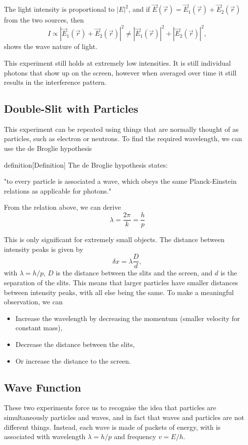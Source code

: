 \documentclass{article}
\begin{document}
The light intensity is proportional to $|E|^2$, and if $\vec{E}(\vec{r})=\vec{E}_1(\vec{r})+\vec{E}_2(\vec{r})$ from the two sources, then
\[
    I \propto \left| \vec{E}_1(\vec{r})+\vec{E}_2(\vec{r}) \right|^2\neq \left| \vec{E}_1(\vec{r}) \right|^2+ \left| \vec{E}_2(\vec{r}) \right|^2,
\]
shows the wave nature of light.

This experiment still holds at extremely low intensities. It is still individual photons that show up on the screen, however when averaged over time it still results in the interference pattern.

\subsection{Double-Slit with Particles}
This experiment can be repeated using things that are normally thought of as particles, such as electron or neutrons. To find the required wavelength, we can use the de Broglie hypothesis
\begin{callout}{definition}[Definition]
\label{definition:s1-d1}
The de Broglie hypothesis states:

\indent "to every particle is associated a wave, which obeys the same Planck-Einstein relations as applicable for photons."

From the relation above, we can derive
\[
    \boxed{\lambda =\frac{2\pi }{k}=\frac{h}{p}}
\]
\end{callout}

This is only significant for extremely small objects. The distance between intensity peaks is given by
\[
    \delta x=\lambda \frac{D}{d},
\]
with $\lambda =h/p$, $D$ is the distance between the slits and the screen, and $d$ is the separation of the slits. This means that larger particles have smaller distances between intensity peaks, with all else being the same. To make a meaningful observation, we can
\begin{itemize}
    \item Increase the wavelength by decreasing the momentum (smaller velocity for constant mass),
    \item Decrease the distance between the slits,
    \item Or increase the distance to the screen.
\end{itemize}

\subsection{Wave Function}
These two experiments force us to recognise the idea that particles are simultaneously particles and waves, and in fact that waves and particles are not different things. Instead, each wave is made of packets of energy, with is associated with wavelength $\lambda =h/p$ and frequency $v=E/h$.
\end{document}
